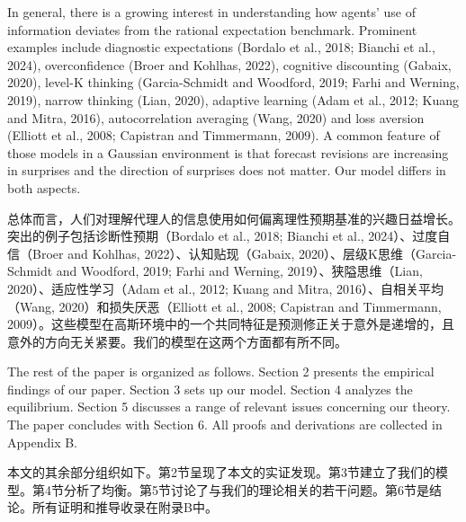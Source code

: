 \documentclass[12pt,a4paper]{article}
\newenvironment{original}
  {\par\medskip\noindent\ignorespaces}
  {\par\medskip}
\newenvironment{translation}
  {\par\noindent{\color{transblue}\ignorespaces}}
  {\par\bigskip}
\begin{document}
\begin{original}
In general, there is a growing interest in understanding how agents' use of information deviates from the rational expectation benchmark. Prominent examples include diagnostic expectations (Bordalo et al., 2018; Bianchi et al., 2024), overconfidence (Broer and Kohlhas, 2022), cognitive discounting (Gabaix, 2020), level-K thinking (Garcia-Schmidt and Woodford, 2019; Farhi and Werning, 2019), narrow thinking (Lian, 2020), adaptive learning (Adam et al., 2012; Kuang and Mitra, 2016), autocorrelation averaging (Wang, 2020) and loss aversion (Elliott et al., 2008; Capistran and Timmermann, 2009). A common feature of those models in a Gaussian environment is that forecast revisions are increasing in surprises and the direction of surprises does not matter. Our model differs in both aspects.
\end{original}
\begin{translation}
总体而言，人们对理解代理人的信息使用如何偏离理性预期基准的兴趣日益增长。突出的例子包括诊断性预期（Bordalo et al., 2018; Bianchi et al., 2024）、过度自信（Broer and Kohlhas, 2022）、认知贴现（Gabaix, 2020）、层级K思维（Garcia-Schmidt and Woodford, 2019; Farhi and Werning, 2019）、狭隘思维（Lian, 2020）、适应性学习（Adam et al., 2012; Kuang and Mitra, 2016）、自相关平均（Wang, 2020）和损失厌恶（Elliott et al., 2008; Capistran and Timmermann, 2009）。这些模型在高斯环境中的一个共同特征是预测修正关于意外是递增的，且意外的方向无关紧要。我们的模型在这两个方面都有所不同。
\end{translation}

\begin{original}
The rest of the paper is organized as follows. Section 2 presents the empirical findings of our paper. Section 3 sets up our model. Section 4 analyzes the equilibrium. Section 5 discusses a range of relevant issues concerning our theory. The paper concludes with Section 6. All proofs and derivations are collected in Appendix B.
\end{original}
\begin{translation}
本文的其余部分组织如下。第2节呈现了本文的实证发现。第3节建立了我们的模型。第4节分析了均衡。第5节讨论了与我们的理论相关的若干问题。第6节是结论。所有证明和推导收录在附录B中。
\end{translation}
\end{document}
